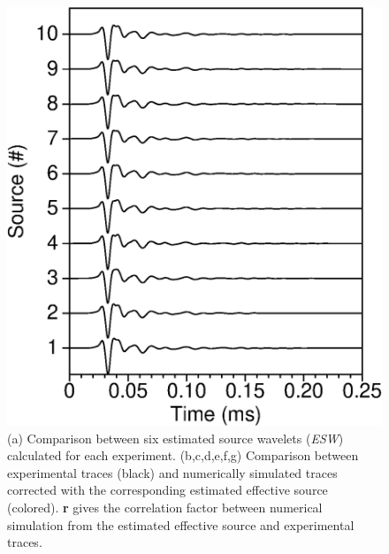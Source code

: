 \documentclass[manuscript,revised]{geophysics}
\begin{document}
\begin{figure}[!h]
	\centering
	\includegraphics[scale=1.0]{fig/F50_once_srcest_wig.eps}
	\caption{(a) Comparison between six estimated source wavelets (\textit{ESW}) calculated for each experiment. (b,c,d,e,f,g) Comparison between experimental traces (black) and numerically simulated traces corrected with the corresponding estimated effective source (colored). \textbf{r} gives the correlation factor between numerical simulation from the estimated effective source and experimental traces.}
	\label{panel_srcest_2d}
\end{figure}
\end{document}
